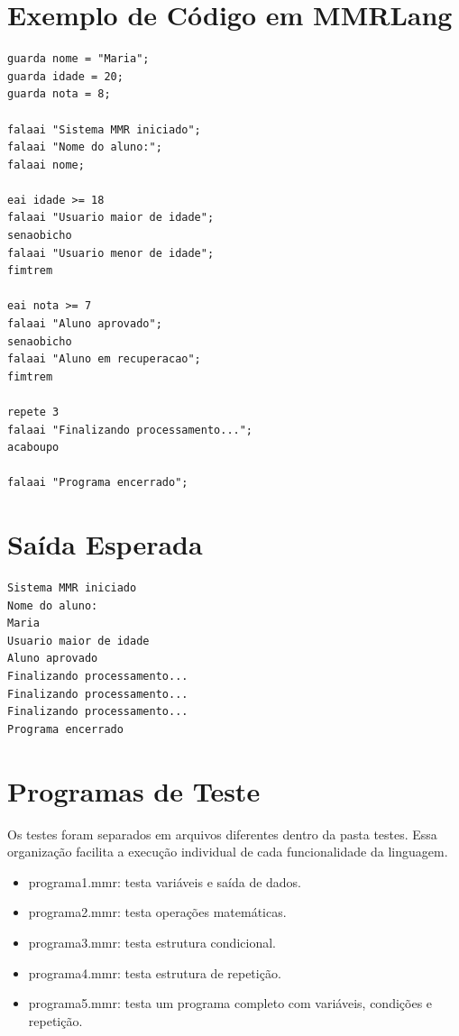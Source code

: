 \documentclass[12pt,a4paper]{article}
\begin{document}
\section{Exemplo de Código em MMRLang}

\begin{lstlisting}
guarda nome = "Maria";
guarda idade = 20;
guarda nota = 8;

falaai "Sistema MMR iniciado";
falaai "Nome do aluno:";
falaai nome;

eai idade >= 18
falaai "Usuario maior de idade";
senaobicho
falaai "Usuario menor de idade";
fimtrem

eai nota >= 7
falaai "Aluno aprovado";
senaobicho
falaai "Aluno em recuperacao";
fimtrem

repete 3
falaai "Finalizando processamento...";
acaboupo

falaai "Programa encerrado";
\end{lstlisting}

\section{Saída Esperada}

\begin{lstlisting}
Sistema MMR iniciado
Nome do aluno:
Maria
Usuario maior de idade
Aluno aprovado
Finalizando processamento...
Finalizando processamento...
Finalizando processamento...
Programa encerrado
\end{lstlisting}

\section{Programas de Teste}

Os testes foram separados em arquivos diferentes dentro da pasta testes. Essa organização facilita a execução individual de cada funcionalidade da linguagem.

\begin{itemize}
\item programa1.mmr: testa variáveis e saída de dados.
\item programa2.mmr: testa operações matemáticas.
\item programa3.mmr: testa estrutura condicional.
\item programa4.mmr: testa estrutura de repetição.
\item programa5.mmr: testa um programa completo com variáveis, condições e repetição.
\end{itemize}
\end{document}
